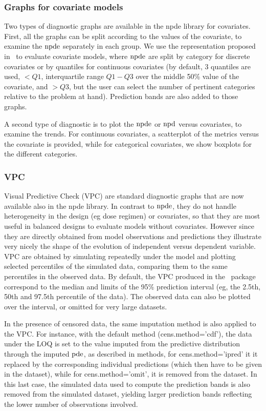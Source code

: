 \subsubsection{Graphs for covariate models} 

\hskip 18pt Two types of diagnostic graphs are available in the {\sf npde} library for covariates. First, all the graphs can be split according to the values of the covariate, to examine the ${\rm npde}$ separately in each group. We use the representation proposed in~\cite{Brendel10} to evaluate covariate models, where ${\rm npde}$ are split by category for discrete covariates or by quantiles for continuous covariates (by default, 3 quantiles are used, $<Q1$, interquartile range $Q1-Q3$ over the middle 50\% value of the covariate, and $>Q3$, but the user can select the number of pertinent categories relative to the problem at hand). Prediction bands are also added to those graphs.

A second type of diagnostic is to plot the ${\rm npde}$ or ${\rm npd}$ versus covariates, to examine the trends. For continuous covariates, a scatterplot of the metrics versus the covariate is provided, while for categorical covariates, we show boxplots for the different categories.

\subsubsection{VPC} 

\hskip 18pt Visual Predictive Check (VPC) are standard diagnostic graphs that are now available also in the {\sf npde} library. In contrast to ${\rm npde}$, they do not handle heterogeneity in the design (eg dose regimen) or covariates, so that they are most useful in balanced designs to evaluate models without covariates. However since they are directly obtained from model observations and predictions they illustrate very nicely the shape of the evolution of independent versus dependent variable. VPC are obtained by simulating repeatedly under the model and plotting selected percentiles of the simulated data, comparing them to the same percentiles in the observed data. By default, the VPC produced in the \npde~package correspond to the median and limits of the 95\% prediction interval (eg, the 2.5th, 50th and 97.5th percentile of the data). The observed data can also be plotted over the interval, or omitted for very large datasets.

In the presence of censored data, the same imputation method is also applied to the VPC. For instance, with the default method ({\sf cens.method='cdf'}), the data under the LOQ is set to the value imputed from the predictive distribution through the imputed ${\rm pde}$, as described in methods, for {\sf cens.method='ipred'} it it replaced by the corresponding individual predictions (which then have to be given in the dataset), while for {\sf cens.method='omit'}, it is removed from the dataset. In this last case, the simulated data used to compute the prediction bands is also removed from the simulated dataset, yielding larger prediction bands reflecting the lower number of observations involved.

